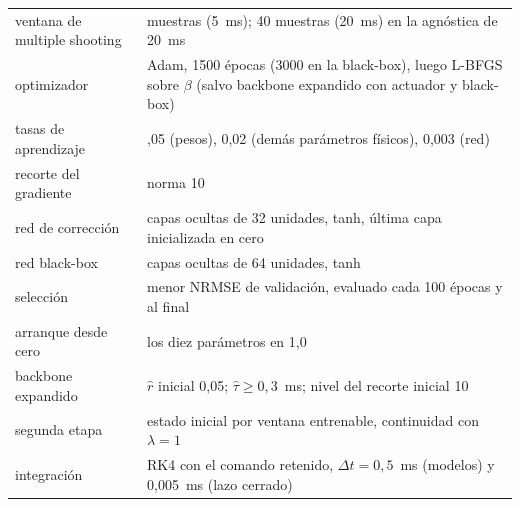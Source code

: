 \documentclass[11pt,a4paper]{article}
\begin{document}
\begin{table}[H]
\centering
\small
\begin{tabular}{@{}l>{\raggedright\arraybackslash}p{}@{}}
\toprule
ventana de multiple shooting & 10 muestras (5~ms); 40 muestras (20~ms) en la agnóstica de 20~ms \\
optimizador & Adam, 1500 épocas (3000 en la black-box), luego L-BFGS sobre $\beta$ (salvo backbone expandido con actuador y black-box) \\
tasas de aprendizaje & 0,05 (pesos), 0,02 (demás parámetros físicos), 0,003 (red) \\
recorte del gradiente & norma 10 \\
red de corrección & 2 capas ocultas de 32 unidades, tanh, última capa inicializada en cero \\
red black-box & 2 capas ocultas de 64 unidades, tanh \\
selección & menor NRMSE de validación, evaluado cada 100 épocas y al final \\
arranque desde cero & los diez parámetros en 1,0 \\
backbone expandido & $\hat r$ inicial 0,05; $\hat\tau \geq 0{,}3$~ms; nivel del recorte inicial 10 \\
segunda etapa & estado inicial por ventana entrenable, continuidad con $\lambda = 1$ \\
integración & RK4 con el comando retenido, $\Delta t = 0{,}5$~ms (modelos) y 0,005~ms (lazo cerrado) \\
\bottomrule
\end{tabular}
\end{table}
\end{document}
